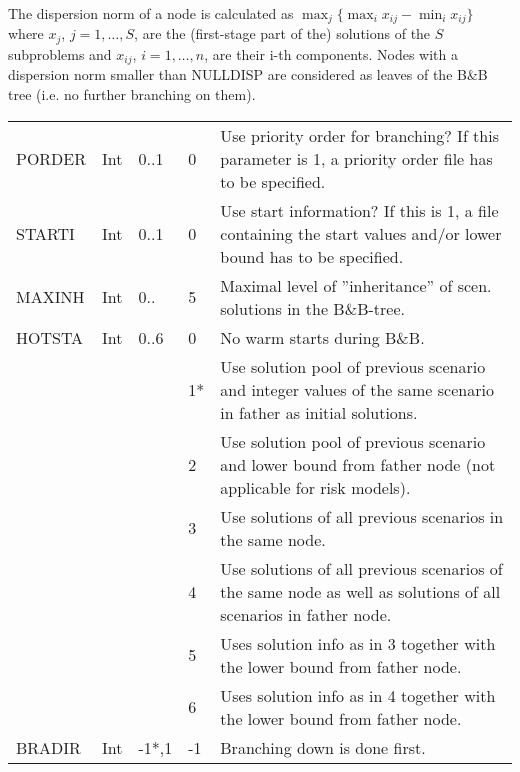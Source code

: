 \documentclass[11pt,draft]{article}
\newcommand{\+}{{\ti{+}}}
\newcommand{\1}{{\ti{1}}}
\begin{document}
The dispersion norm of a node is calculated as $\max_{j}  \{  \max_{i}
x_{ij} - \min_{i} x_{ij}\}$ where $x_j$, $j=1,\ldots,S$, are the (first-stage part of the) solutions
of the $S$ subproblems and $x_{ij}$, $i=1,\ldots,n$, are their i-th components.
Nodes with a dispersion norm smaller than NULLDISP are considered as leaves of the 
B\&B tree (i.e. no further branching on them).

\newpage
\begin{center}
\tablelasttail{\hline}
\begin{supertabular}{|llllp{6.2cm}|} 
PORDER&Int&0..1&0&Use priority order for branching? If this
parameter is 1, a priority order file has to be specified. \\[0.2em]
STARTI&Int&0..1&0&Use start information? If this is 1, a file
  containing the start values and/or lower bound has to be specified.\\[0.2em]
MAXINH&Int&0..&5&Maximal level of ''inheritance'' of scen. solutions in the B\&B-tree.\\[0.2em]
HOTSTA&Int&0..6&0&No warm starts during B\&B.\\
&&&1*&Use solution pool of previous scenario and integer values of the same scenario in father as initial solutions.\\
&&&2&Use solution pool of previous scenario and lower bound from father node (not applicable for risk models).\\
&&&3&Use solutions of all previous scenarios in the same node.\\ 
&&&4&Use solutions of all previous scenarios of the same node as well as solutions of all scenarios in father node.\\ 
&&&5&Uses solution info as in 3 together with the lower bound from father node.\\ 
&&&6&Uses solution info as in 4 together with the lower bound from father node.\\[0.2em]
BRADIR&Int&-1*,1&-1&Branching down is done first.\\

\end{supertabular}
\end{center}
\end{document}
